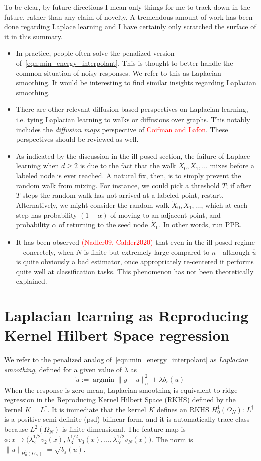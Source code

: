 \documentclass{article}
\newcommand{\1}{\mathbf{1}}
\DeclareMathOperator*{\argmin}{argmin}
\newcommand{\wt}[1]{\widetilde{#1}}
\newcommand{\wh}[1]{\widehat{#1}}
\theoremstyle{definition}
\theoremstyle{remark}
\begin{document}
To be clear, by future directions I mean only things for me to track down in the future, rather than any claim of novelty. A tremendous amount of work has been done regarding Laplace learning and I have certainly only scratched the surface of it in this summary.
\begin{itemize}
	\item In practice, people often solve the penalized version of~\eqref{eqn:min_energy_interpolant}. This is thought to better handle the common situation of noisy responses. We refer to this as Laplacian smoothing. It would be interesting to find similar insights regarding Laplacian smoothing.
	\item There are other relevant diffusion-based perspectives on Laplacian learning, i.e. tying Laplacian learning to walks or diffusions over graphs. This notably includes the \emph{diffusion maps} perspective of \textcolor{red}{Coifman and Lafon}. These perspectives should be reviewed as well. 
	\item As indicated by the discussion in the ill-posed section, the failure of Laplace learning when $d \geq 2$ is due to the fact that the walk $X_0,X_1,\ldots$ mixes before a labeled node is ever reached. A natural fix, then, is to simply prevent the random walk from mixing. For instance, we could pick a threshold $T$; if after $T$ steps the random walk has not arrived at a labeled point, restart. Alternatively, we might consider the random walk $\wt{X}_0,\wt{X}_1,\ldots$, which at each step has probability $(1 - \alpha)$ of moving to an adjacent point, and probability $\alpha$ of returning to the seed node $\wt{X}_0$. In other words, run PPR.
	\item It has been observed \textcolor{red}{(Nadler09, Calder2020)} that even in the ill-posed regime---concretely, when $N$ is finite but extremely large compared to $n$---although $\wh{u}$ is quite obviously a bad estimator, once appropriately re-centered it performs quite well at classification tasks. This phenomenon has not been theoretically explained. 
\end{itemize}

\section{Laplacian learning as Reproducing Kernel Hilbert Space regression}
We refer to the penalized analog of~\eqref{eqn:min_energy_interpolant} as \emph{Laplacian smoothing}, defined for a given value of $\lambda$ as
\begin{equation*}
\wt{u} := \argmin \|y - u\|_n^2 + \lambda b_r(u)
\end{equation*}
When the response is zero-mean, Laplacian smoothing is equivalent to ridge regression in the Reproducing Kernel Hilbert Space (RKHS) defined by the kernel $K = L^{\dagger}$. It is immediate that the kernel $K$ defines an RKHS $H_0^1(\Omega_N)$: $L^{\dagger}$ is a positive semi-definite (psd) bilinear form, and it is automatically trace-class because $L^2(\Omega_N)$ is finite-dimensional. The feature map is $\phi: x \mapsto \bigl(\lambda_2^{1/2} v_2(x),\lambda_3^{1/2} v_3(x),\ldots,\lambda_N^{1/2} v_N(x)\bigr)$. The norm is $\|u\|_{H_0^1(\Omega_N)} = \sqrt{b_{\varepsilon}(u)}$. 
\end{document}
